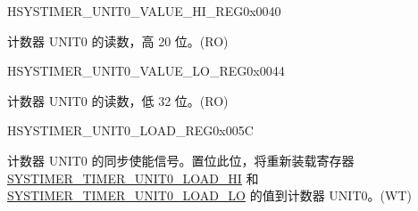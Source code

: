 \begin{register}{H}{SYSTIMER\_UNIT0\_VALUE\_HI\_REG}{0x{}0040}\label{regdesc:SYSTIMERUNIT0VALUEHIREG}
%
%
\regnewline%
\begin{regdesc}\begin{reglist}
\label{fielddesc:SYSTIMERTIMERUNIT0VALUEHI}\item [SYSTIMER\_TIMER\_UNIT0\_VALUE\_HI] 计数器 UNIT0 的读数，高 20 位。(RO)
\end{reglist}\end{regdesc}
\end{register}


\begin{register}{H}{SYSTIMER\_UNIT0\_VALUE\_LO\_REG}{0x{}0044}\label{regdesc:SYSTIMERUNIT0VALUELOREG}
%
\regnewline%
\begin{regdesc}\begin{reglist}
\label{fielddesc:SYSTIMERTIMERUNIT0VALUELO}\item [SYSTIMER\_TIMER\_UNIT0\_VALUE\_LO] 计数器 UNIT0 的读数，低 32 位。(RO)
\end{reglist}\end{regdesc}
\end{register}


\begin{register}{H}{SYSTIMER\_UNIT0\_LOAD\_REG}{0x{}005C}\label{regdesc:SYSTIMERUNIT0LOADREG}
%
%
\regnewline%
\begin{regdesc}\begin{reglist}
\label{fielddesc:SYSTIMERTIMERUNIT0LOAD}\item [SYSTIMER\_TIMER\_UNIT0\_LOAD] 计数器 UNIT0 的同步使能信号。置位此位，将重新装载寄存器 \hyperref[fielddesc:SYSTIMERTIMERUNIT0LOADHI]{SYSTIMER\_TIMER\_UNIT0\_LOAD\_HI} 和 \hyperref[fielddesc:SYSTIMERTIMERUNIT0LOADLO]{SYSTIMER\_TIMER\_UNIT0\_LOAD\_LO} 的值到计数器 UNIT0。(WT)
\end{reglist}\end{regdesc}
\end{register}


